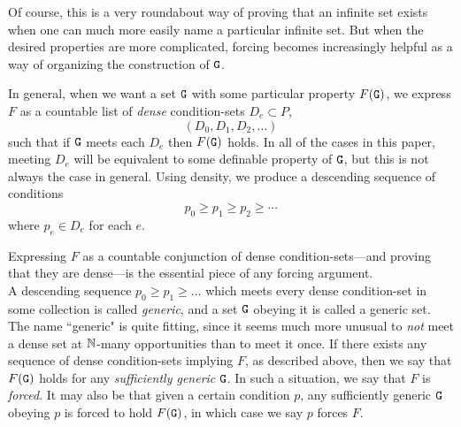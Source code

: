 \documentclass{amsart}
\begin{document}
	Of course, this is a very roundabout way of proving that an infinite set exists when one can much more easily name a particular infinite set. But when the desired properties are more complicated, forcing becomes increasingly helpful as a way of organizing the construction of $\tt{G}$.
	
	In general, when we want a set $\tt{G}$ with some particular property $F(\tt{G})$, we express $F$ as a countable list of \textit{dense} condition-sets $D_e\subset P$,
	$$
	(D_0,D_1,D_2,\dots)
	$$
	such that if $\tt{G}$ meets each $D_e$ then $F(\tt{G})$ holds. In all of the cases in this paper, meeting $D_e$ will be equivalent to some definable property of $\tt{G}$, but this is not always the case in general. Using density, we produce a descending sequence of conditions
	$$
	p_0 \geq p_1 \geq p_2 \geq \cdots
	$$
	where $p_e\in D_e$ for each $e$. 
	
	Expressing $F$ as a countable conjunction of dense condition-sets---and proving that they are dense---is the essential piece of any forcing argument.\\
	
	A descending sequence $p_0\geq p_1 \geq \dots$ which meets every dense condition-set in some collection is called \textit{generic}, and a set $\tt{G}$ obeying it is called a generic set. The name ``generic" is quite fitting, since it seems much more unusual to \textit{not} meet a dense set at $\mathbb{N}$-many opportunities than to meet it once. If there exists any sequence of dense condition-sets implying $F$, as described above, then we say that $F(\tt{G})$ holds for any \textit{sufficiently generic} $\tt{G}$. In such a situation, we say that $F$ is \textit{forced}. It may also be that given a certain condition $p$, any sufficiently generic $\tt{G}$ obeying $p$ is forced to hold $F(\tt{G})$, in which case we say $p$ forces $F$.
	
	
\end{document}
